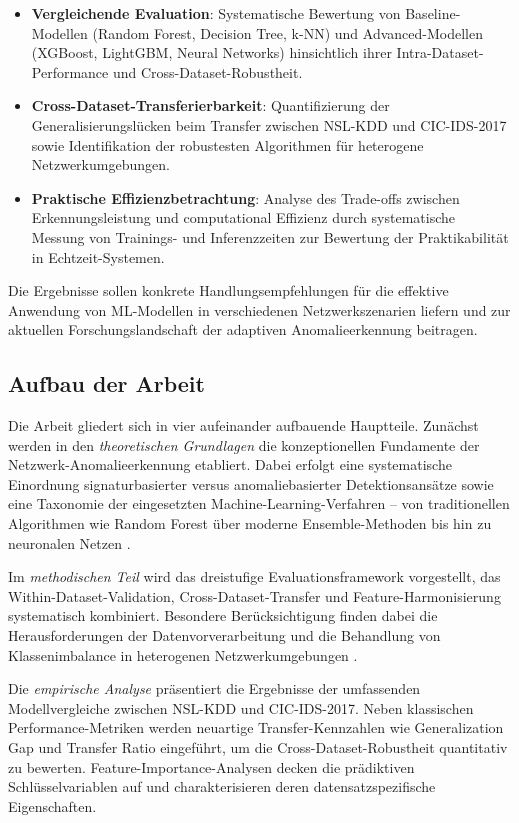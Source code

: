 \documentclass[11pt,a4paper]{article}
\begin{document}
    \begin{itemize}
        \item \textbf{Vergleichende Evaluation}: Systematische Bewertung von Baseline-Modellen (Random Forest, Decision Tree, k-NN) und Advanced-Modellen (XGBoost, LightGBM, Neural Networks) hinsichtlich ihrer Intra-Dataset-Performance und Cross-Dataset-Robustheit.
        \item \textbf{Cross-Dataset-Transferierbarkeit}: Quantifizierung der Generalisierungslücken beim Transfer zwischen NSL-KDD und CIC-IDS-2017 sowie Identifikation der robustesten Algorithmen für heterogene Netzwerkumgebungen.
        \item \textbf{Praktische Effizienzbetrachtung}: Analyse des Trade-offs zwischen Erkennungsleistung und computational Effizienz durch systematische Messung von Trainings- und Inferenzzeiten zur Bewertung der Praktikabilität in Echtzeit-Systemen.
    \end{itemize}

    Die Ergebnisse sollen konkrete Handlungsempfehlungen für die effektive Anwendung von ML-Modellen in verschiedenen Netzwerkszenarien liefern und zur aktuellen Forschungslandschaft der adaptiven Anomalieerkennung beitragen.

    \subsection{Aufbau der Arbeit}

    Die Arbeit gliedert sich in vier aufeinander aufbauende Hauptteile. Zunächst werden in den \textit{theoretischen Grundlagen} die konzeptionellen Fundamente der Netzwerk-Anomalieerkennung etabliert. Dabei erfolgt eine systematische Einordnung signaturbasierter versus anomaliebasierter Detektionsansätze sowie eine Taxonomie der eingesetzten Machine-Learning-Verfahren – von traditionellen Algorithmen wie Random Forest über moderne Ensemble-Methoden bis hin zu neuronalen Netzen \parencite{McHugh2000,Vinayakumar2019}. 

    Im \textit{methodischen Teil} wird das dreistufige Evaluationsframework vorgestellt, das Within-Dataset-Validation, Cross-Dataset-Transfer und Feature-Harmonisierung systematisch kombiniert. Besondere Berücksichtigung finden dabei die Herausforderungen der Datenvorverarbeitung und die Behandlung von Klassenimbalance in heterogenen Netzwerkumgebungen \parencite{Gharib2016}.

    Die \textit{empirische Analyse} präsentiert die Ergebnisse der umfassenden Modellvergleiche zwischen NSL-KDD und CIC-IDS-2017. Neben klassischen Performance-Metriken werden neuartige Transfer-Kennzahlen wie Generalization Gap und Transfer Ratio eingeführt, um die Cross-Dataset-Robustheit quantitativ zu bewerten. Feature-Importance-Analysen decken die prädiktiven Schlüsselvariablen auf und charakterisieren deren datensatzspezifische Eigenschaften.
\end{document}
